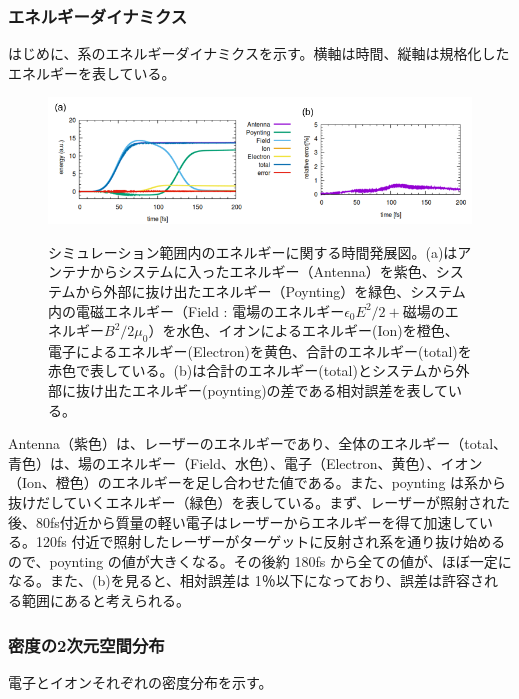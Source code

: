 \documentclass[a4paper,11pt,titlepage]{jarticle}
\numberwithin{equation}{section} %
\begin{document}
  \subsubsection{エネルギーダイナミクス}
はじめに、系のエネルギーダイナミクスを示す。横軸は時間、縦軸は規格化したエネルギーを表している。

\begin{figure}[H]
  \begin{center}
    \includegraphics[scale=0.5]{./image/4-2-slab_dynamics.png}
    \label{fig:4-2}
    \caption{シミュレーション範囲内のエネルギーに関する時間発展図。(a)はアンテナからシステムに入ったエネルギー（Antenna）を紫色、システムから外部に抜け出たエネルギー（Poynting）を緑色、システム内の電磁エネルギー（Field : 電場のエネルギー$\epsilon_0E^{2}/2　+$磁場のエネルギー$B^{2}/2\mu_0$）を水色、イオンによるエネルギー(Ion)を橙色、電子によるエネルギー(Electron)を黄色、合計のエネルギー(total)を赤色で表している。(b)は合計のエネルギー(total)とシステムから外部に抜け出たエネルギー(poynting)の差である相対誤差を表している。}
  \end{center}
\end{figure}

Antenna（紫色）は、レーザーのエネルギーであり、全体のエネルギー（total、青色）は、場のエネルギー（Field、水色）、電子（Electron、黄色）、イオン（Ion、橙色）のエネルギーを足し合わせた値である。また、poynting は系から抜けだしていくエネルギー（緑色）を表している。まず、レーザーが照射された後、80fs付近から質量の軽い電子はレーザーからエネルギーを得て加速している。120fs 付近で照射したレーザーがターゲットに反射され系を通り抜け始めるので、poynting の値が大きくなる。その後約 180fs から全ての値が、ほぼ一定になる。また、(b)を見ると、相対誤差は 1％以下になっており、誤差は許容される範囲にあると考えられる。

\subsubsection{密度の2次元空間分布}

電子とイオンそれぞれの密度分布を示す。
\end{document}
